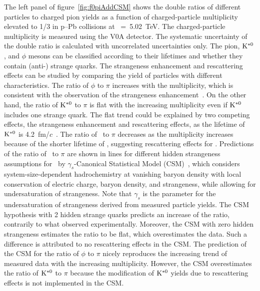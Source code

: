 The left panel of figure~\ref{fig:f0piAddCSM} shows the double ratios of different particles to charged pion yields as a function of charged-particle multiplicity elevated to 1/3 in p--Pb collisions at \snn~=~5.02~TeV. The charged-particle multiplicity is measured using the V0A detector. The systematic uncertainty of the double ratio is calculated with uncorrelated uncertainties only. The pion, $\rm{}K^{*0}$, and $\phi$ mesons can be classified according to their lifetimes and whether they contain (anti-) strange quarks. The strangeness enhancement and rescattering effects can be studied by comparing the yield of particles with different characteristics. The ratio of $\phi$ to $\pi$ increases with the multiplicity, which is consistent with the observation of the strangeness enhancement~\cite{ALICE:2016fzo}. On the other hand, the ratio of $\rm{}K^{*0}$ to $\pi$ is flat with the increasing multiplicity even if $\rm{}K^{*0}$ includes one strange quark. The flat trend could be explained by two competing effects, the strangeness enhancement and rescattering effects, as the lifetime of $\rm{}K^{*0}$ is 4.2~fm/$c$~\cite{ParticleDataGroup:2020ssz}. The ratio of \fzero~to $\pi$ decreases as the multiplicity increases because of the shorter lifetime of \fzero, suggesting rescattering effects for \fzero. Predictions of the ratio of \fzero~to $\pi$ are shown in lines for different hidden strangeness assumptions for \fzero~by $\gamma_{s}$-Canonical Statistical Model (CSM)~\cite{Vovchenko:2019kes}, which considers system-size-dependent hadrochemistry at vanishing baryon density with local conservation of electric charge, baryon density, and strangeness, while allowing for undersaturation of strangeness. Note that $\gamma_{s}$ is the parameter for the undersaturation of strangeness derived from measured particle yields. The CSM hypothesis with 2 hidden strange quarks predicts an increase of the ratio, contrarily to what observed experimentally. Moreover, the CSM with zero hidden strangeness estimates the ratio to be flat, which overestimates the data. Such a difference is attributed to no rescattering effects in the CSM. The prediction of the CSM for the ratio of $\phi$ to $\pi$ nicely reproduces the increasing trend of measured data with the increasing multiplicity. However, the CSM overestimates the ratio of $\rm{}K^{*0}$ to $\pi$ because the modification of $\rm{}K^{*0}$ yields due to rescattering effects is not implemented in the CSM.

